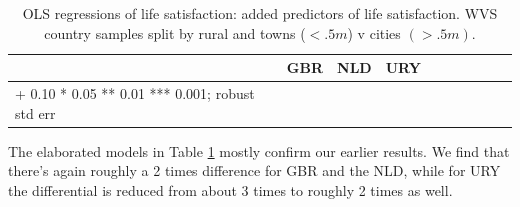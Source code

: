 \documentclass[10pt, letterpaper]{article}
\begin{document}
\begin{spacing}{1.4}
\begin{spacing}{.9} \begin{table}[H]\centering   \begin{scriptsize} \begin{tabular}{p{1.8in}p{.5in}p{.5in}|p{.5in}p{.5in}|p{.5in}p{.5in}|p{.5in}p{.5in}p{.5in}p{.5
                                                                      in}p{.5in}p{.5
                                                                      in}}\hline\hline&\multicolumn{2}{c}{GBR}&\multicolumn{2}{c}{NLD}&\multicolumn{2}{c}{URY}\\
                                                                      
                                                                      \hline +
                                                                      0.10 *
                                                                      0.05 **
                                                                      0.01 ***
                                                                      0.001;
                                                                      robust std
                                                                      err \end{tabular}\end{scriptsize}\caption{\label{b}OLS
                                                                    regressions
                                                                    of life
                                                                    satisfaction:
                                                                    added
                                                                    predictors
                                                                    of life satisfaction. WVS
                                                                   country
                                                                   samples split
                                                                 by rural and towns ($<.5m$) v cities $(>.5m)$.}\end{table} \end{spacing}

The elaborated models in Table \ref{b} mostly confirm our earlier results. We find that there's again roughly a 2 times difference for GBR and the NLD, while for URY the differential is reduced from about 3 times to roughly 2 times as well. 


\end{spacing}
\end{document}
